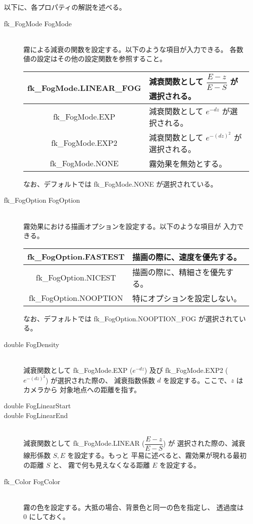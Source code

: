 以下に、各プロパティの解説を述べる。
\begin{description}
 \item[fk\_FogMode FogMode] ~ \\
	霧による減衰の関数を設定する。以下のような項目が入力できる。
	各数値の設定はその他の設定関数を参照すること。
	\begin{center}
	\begin{tabular}{|c|p{7cm}|}
	\hline
	fk\_FogMode.LINEAR\_FOG & 減衰関数として \(\dfrac{E - z}{E - S}\) が
		選択される。\\ \hline
	fk\_FogMode.EXP & 減衰関数として \(e^{-dz}\) が選択される。\\ \hline
	fk\_FogMode.EXP2 & 減衰関数として \(e^{-(dz)^2}\) が選択される。\\ \hline
	fk\_FogMode.NONE & 霧効果を無効とする。\\ \hline
	\end{tabular}
	\end{center}
	なお、デフォルトでは fk\_FogMode.NONE が選択されている。\\

 \item[fk\_FogOption FogOption] ~ \\
	霧効果における描画オプションを設定する。以下のような項目が
	入力できる。
	\begin{center}
	\begin{tabular}{|c|p{7cm}|}
	\hline
	fk\_FogOption.FASTEST & 描画の際に、速度を優先する。\\ \hline
	fk\_FogOption.NICEST & 描画の際に、精細さを優先する。\\ \hline
	fk\_FogOption.NOOPTION & 特にオプションを設定しない。\\ \hline
	\end{tabular}
	\end{center}
	なお、デフォルトでは fk\_FogOption.NOOPTION\_FOG が選択されている。\\

 \item[double FogDensity] ~ \\
	減衰関数として fk\_FogMode.EXP (\(e^{-dz}\)) 
	及び fk\_FogMode.EXP2 (\(e^{-(dz)^2}\)) が選択された際の、	
	減衰指数係数 \(d\) を設定する。ここで、\(z\) はカメラから
	対象地点への距離を指す。\\

 \item[double FogLinearStart]
 \item[double FogLinearEnd] ~ \\
	減衰関数として fk\_FogMode.LINEAR (\(\dfrac{E - z}{E - S}\)) が
	選択された際の、減衰線形係数 \(S, E\) を設定する。もっと
	平易に述べると、霧効果が現れる最初の距離 \(S\) と、
	霧で何も見えなくなる距離 \(E\) を設定する。\\

 \item[fk\_Color FogColor] ~ \\
	霧の色を設定する。大抵の場合、背景色と同一の色を指定し、
	透過度は 0 にしておく。
\end{description}

